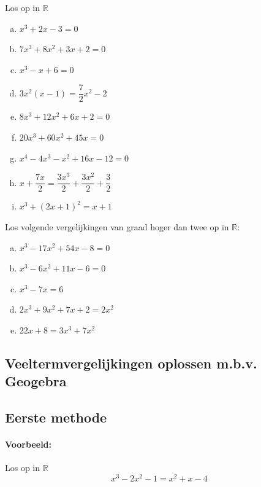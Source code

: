 \documentclass[12pt]{article}
\begin{document}
\begin{oefening}
  Los op in $\mathbb{R}$
  \begin{multicols}{2}
    \begin{enumerate}[(a)]
      \itemsep0.7em
    \item $x^3+2x-3=0$
    \item $7x^3+8x^2+3x+2=0$
    \item $x^3-x+6=0$
    \item $3x^2(x-1)=\dfrac{7}{2}x^2-2$
    \item $8x^3+12x^2+6x+2=0$
    \item $20x^3+60x^2+45x=0$
    \item $x^4-4x^3-x^2+16x-12=0$
    \item $x+\dfrac{7x}{2}=\dfrac{3x^3}{2}+\dfrac{3x^2}{2}+\dfrac{3}{2}$
    \item $x^3+(2x+1)^2=x+1$
    \end{enumerate}
  \end{multicols}
\end{oefening}

\begin{oefening} %
  Los volgende vergelijkingen van graad hoger dan twee op in $\mathbb{R}$:
  \begin{enumerate}[(a)]
    \itemsep1em
  \item $x^3-17x^2+54x-8=0$
  \item $x^3-6x^2+11x-6=0$
  \item $x^3-7x=6$
  \item $2x^3+9x^2+7x+2=2x^2$
  \item $22x+8=3x^3+7x^2$
  \end{enumerate}
\end{oefening}

\pagebreak

\subsection{Veeltermvergelijkingen oplossen m.b.v. Geogebra}

\subsection*{Eerste methode}

\paragraph*{Voorbeeld:} Los op in $\mathbb{R}$
$$x^3-2x^2-1=x^2+x-4$$
\end{document}
